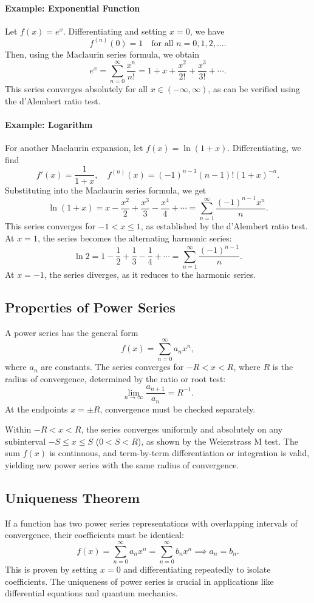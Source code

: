 \documentclass[12pt]{article}
\begin{document}
\paragraph{Example: Exponential Function}
Let \(f(x) = e^x\). Differentiating and setting \(x = 0\), we have
\[
f^{(n)}(0) = 1 \quad \text{for all } n = 0, 1, 2, \dots.
\]
Then, using the Maclaurin series formula, we obtain
\[
e^x = \sum_{n=0}^\infty \frac{x^n}{n!} = 1 + x + \frac{x^2}{2!} + \frac{x^3}{3!} + \cdots.
\]
This series converges absolutely for all \(x \in (-\infty, \infty)\), as can be verified using the d'Alembert ratio test.

\paragraph{Example: Logarithm}
For another Maclaurin expansion, let \(f(x) = \ln(1 + x)\). Differentiating, we find
\[
f'(x) = \frac{1}{1+x}, \quad f^{(n)}(x) = (-1)^{n-1} (n-1)! (1+x)^{-n}.
\]
Substituting into the Maclaurin series formula, we get
\[
\ln(1 + x) = x - \frac{x^2}{2} + \frac{x^3}{3} - \frac{x^4}{4} + \cdots = \sum_{n=1}^\infty \frac{(-1)^{n-1} x^n}{n}.
\]
This series converges for \(-1 < x \leq 1\), as established by the d'Alembert ratio test. At \(x = 1\), the series becomes the alternating harmonic series:
\[
\ln 2 = 1 - \frac{1}{2} + \frac{1}{3} - \frac{1}{4} + \cdots = \sum_{n=1}^\infty \frac{(-1)^{n-1}}{n}.
\]
At \(x = -1\), the series diverges, as it reduces to the harmonic series.

\subsection{Properties of Power Series}
A power series has the general form
\[
f(x) = \sum_{n=0}^\infty a_n x^n,
\]
where \(a_n\) are constants. The series converges for \(-R < x < R\), where \(R\) is the radius of convergence, determined by the ratio or root test:
\[
\lim_{n \to \infty} \frac{a_{n+1}}{a_n} = R^{-1}.
\]
At the endpoints \(x = \pm R\), convergence must be checked separately.

Within \(-R < x < R\), the series converges uniformly and absolutely on any subinterval \(-S \leq x \leq S\) (\(0 < S < R\)), as shown by the Weierstrass M test. The sum \(f(x)\) is continuous, and term-by-term differentiation or integration is valid, yielding new power series with the same radius of convergence.

\subsection{Uniqueness Theorem}
If a function has two power series representations with overlapping intervals of convergence, their coefficients must be identical:
\[
f(x) = \sum_{n=0}^\infty a_n x^n = \sum_{n=0}^\infty b_n x^n \implies a_n = b_n.
\]
This is proven by setting \(x = 0\) and differentiating repeatedly to isolate coefficients. The uniqueness of power series is crucial in applications like differential equations and quantum mechanics.
\end{document}
